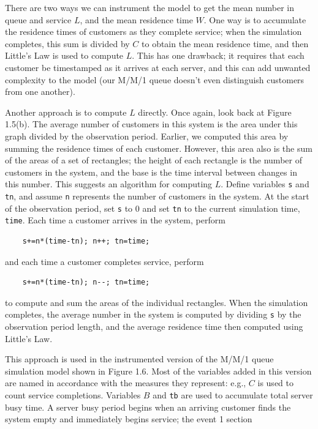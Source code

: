 There are two ways we can instrument the model to get the mean number in queue
and service $L$, and the mean residence time $W$. One way is to accumulate the
residence times of customers as they complete service; when the simulation
completes, this sum is divided by $C$ to obtain the mean residence time, and then
Little's Law is used to compute $L$. This has one drawback; it requires that each
customer be timestamped as it arrives at each server, and this can add unwanted
complexity to the model (our M/M/1 queue doesn't even distinguish customers from
one another).

Another approach is to compute $L$ directly. Once again, look back at Figure
1.5(b). The average number of customers in this system is the area under this
graph divided by the observation period. Earlier, we computed this area by
summing the residence times of each customer. However, this area also is the sum
of the areas of a set of rectangles; the height of each rectangle is the number
of customers in the system, and the base is the time interval between changes in
this number. This suggests an algorithm for computing $L$. Define variables
\texttt{s} and \texttt{tn}, and assume \texttt{n} represents the number of customers
in the system. At the start of the observation period, set \texttt{s} to 0 and
set \texttt{tn} to the current simulation time, \texttt{time}. Each time a
customer arrives in the system, perform
\begin{verbatim}
    s+=n*(time-tn); n++; tn=time;
\end{verbatim}
and each time a customer completes service, perform
\begin{verbatim}
    s+=n*(time-tn); n--; tn=time;
\end{verbatim}
to compute and sum the areas of the individual rectangles. When the simulation
completes, the average number in the system is computed by dividing \texttt{s}
by the observation period length, and the average residence time then computed
using Little's Law.

This approach is used in the instrumented version of the M/M/1 queue simulation
model shown in Figure 1.6. Most of the variables added in this version are
named in accordance with the measures they represent: e.g., $C$ is used to count
service completions. Variables $B$ and \texttt{tb} are used to accumulate total
server busy time. A server busy period begins when an arriving customer finds
the system empty and immediately begins service; the event 1 section

